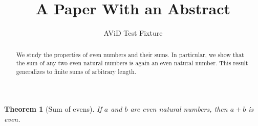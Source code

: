 \documentclass{article}
\title{A Paper With an Abstract}
\author{AViD Test Fixture}
\newtheorem{theorem}{Theorem}
\begin{document}
\maketitle

\begin{abstract}
We study the properties of even numbers and their sums.
In particular, we show that the sum of any two even natural numbers
is again an even natural number. This result generalizes to
finite sums of arbitrary length.
\end{abstract}

\begin{theorem}[Sum of evens]
If $a$ and $b$ are even natural numbers, then $a + b$ is even.
\end{theorem}
\end{document}

